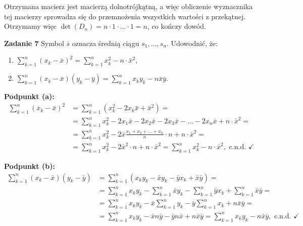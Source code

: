 \documentclass[a4paper,12pt]{article}
\begin{document}
\noindent Otrzymana macierz jest macierzą dolnotrójkątną, a więc obliczenie 
wyznacznika tej macierzy sprowadza się do przemnożenia wszystkich wartości
z przekątnej. Otrzymamy więc $\det(D_n) = n \cdot 1 \cdot \ldots \cdot 1 = n$,
co kończy dowód.

\newpage
\noindent \textbf{Zadanie 7} \newline
Symbol $\bar{s}$ oznacza średnią ciągu $s_1, \ldots, s_n$. Udowodnić, że:
\begin{enumerate}[label=(\alph*)]
    \item $\sum\limits_{k=1}^{n} (x_k - \bar{x})^2 = 
           \sum\limits_{k=1}^{n} x_k^2 - n \cdot \bar{x}^2$,
    \item $\sum\limits_{k=1}^{n} (x_k - \bar{x})(y_k - \bar{y}) =
           \sum\limits_{k=1}^{n} x_k y_k - n \bar{x} \bar{y}$.
\end{enumerate}

\noindent \textbf{Podpunkt (a):}
\begin{align*}
    \sum\limits_{k=1}^{n} (x_k - \bar{x})^2 &= 
        \sum\limits_{k=1}^{n} (x_k^2 - 2 x_k \bar{x} + \bar{x}^2) = \\
    &= \sum\limits_{k=1}^{n} x_k^2 - 2 x_1 \bar{x} - 2 x_2 \bar{x}
        - 2 x_3 \bar{x} - \ldots - 2 x_n \bar{x} + n \cdot \bar{x}^2 = \\
    &= \sum\limits_{k=1}^{n} x_k^2 
        - 2 \bar{x} \frac{x_1 + x_2 + \ldots + x_n}{n} \cdot n + n \cdot \bar{x}^2 = \\
    &= \sum\limits_{k=1}^{n} x_k^2 - 2 \bar{x}^2 \cdot n + n \cdot \bar{x}^2 =
        \sum\limits_{k=1}^{n} x_k^2 - n \cdot \bar{x}^2, \text{ c.n.d. } \checkmark
\end{align*}

\noindent \textbf{Podpunkt (b):}
\begin{align*}
    \sum\limits_{k=1}^{n} (x_k - \bar{x})(y_k - \bar{y}) &= 
        \sum\limits_{k=1}^{n} \left(
            x_k y_k - \bar{x} y_k - \bar{y} x_k + \bar{x} \bar{y}
        \right) = \\
    &= \sum\limits_{k=1}^{n} x_k y_k - \sum\limits_{k=1}^{n} \bar{x} y_k
       - \sum\limits_{k=1}^{n} \bar{y} x_k + \sum\limits_{k=1}^{n} \bar{x} \bar{y} = \\
    &= \sum\limits_{k=1}^{n} x_k y_k - \bar{x} \sum\limits_{k=1}^{n} y_k
       - \bar{y} \sum\limits_{k=1}^{n} x_k + n \bar{x} \bar{y} = \\
    &= \sum\limits_{k=1}^{n} x_k y_k - \bar{x} n \bar{y} - \bar{y} n \bar{x} + n \bar{x} \bar{y} =
       \sum\limits_{k=1}^{n} x_k y_k - n \bar{x} \bar{y}, \text{ c.n.d. } \checkmark
\end{align*}
\end{document}
